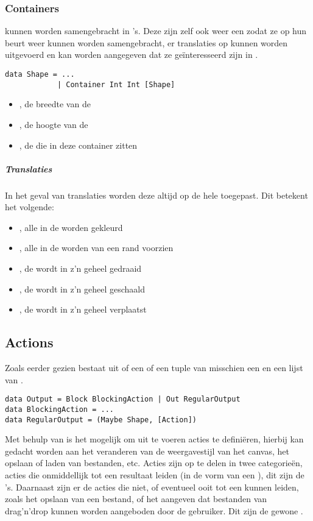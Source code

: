 \subsubsection{Containers}
\shapes kunnen worden samengebracht in 's. Deze zijn zelf ook weer een \shape zodat ze op hun beurt weer kunnen worden samengebracht, er translaties op kunnen worden uitgevoerd en kan worden aangegeven dat ze ge\"interesseerd zijn in \events. 
\begin{lstlisting}
data Shape = ...
			| Container Int Int [Shape]
\end{lstlisting}
\begin{itemize}
	\item {}, de breedte van de 
	\item {}, de hoogte van de 
	\item \type{[Shape]}, de \shapes die in deze container zitten
\end{itemize}

\subparagraph{Translaties}
In het geval van translaties worden deze altijd op de hele  toegepast. Dit betekent het volgende:
\begin{itemize}
	\item {}, alle \shapes in de  worden gekleurd
	\item {}, alle \shapes in de  worden van een rand voorzien
	\item {}, de  wordt in z'n geheel gedraaid
	\item {}, de  wordt in z'n geheel geschaald
	\item {}, de  wordt in z'n geheel verplaatst
\end{itemize}

\subsection{Actions}
Zoals eerder gezien bestaat  uit of een  of een tuple van misschien een \shape en een lijst van \actions. 
\begin{lstlisting}
data Output = Block BlockingAction | Out RegularOutput
data BlockingAction = ... 
data RegularOutput = (Maybe Shape, [Action])
\end{lstlisting}

Met behulp van \actions is het mogelijk om uit te voeren acties te defini\"eren, hierbij kan gedacht worden aan het veranderen van de weergavestijl van het canvas, het opslaan of laden van bestanden, etc.
Acties zijn op te delen in twee categorieën, acties die onmiddellijk tot een resultaat leiden (in de vorm van een ), dit zijn de 's. Daarnaast zijn er de acties die niet, of eventueel ooit tot een  kunnen leiden, zoals het opslaan van een bestand, of het aangeven dat bestanden van drag'n'drop kunnen worden aangeboden door de gebruiker. Dit zijn de gewone \actions.


